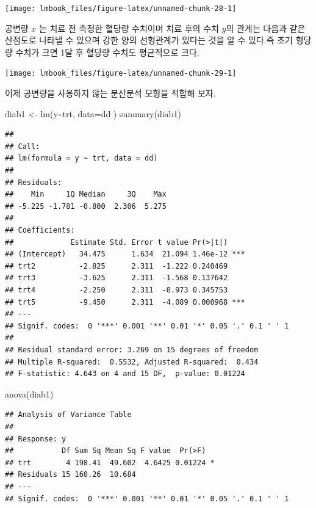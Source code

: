 \documentclass[
  10pt,
]{book}
\newenvironment{Shaded}{\begin{snugshade}}{\end{snugshade}}
\newcommand{\AttributeTok}[1]{\textcolor[rgb]{0.77,0.63,0.00}{#1}}
\newcommand{\FunctionTok}[1]{\textcolor[rgb]{0.00,0.00,0.00}{#1}}
\newcommand{\NormalTok}[1]{#1}
\newcommand{\OtherTok}[1]{\textcolor[rgb]{0.56,0.35,0.01}{#1}}
\newcommand{\SpecialCharTok}[1]{\textcolor[rgb]{0.00,0.00,0.00}{#1}}
\theoremstyle{definition}
\theoremstyle{definition}
\theoremstyle{definition}
\theoremstyle{definition}
\theoremstyle{remark}
\begin{document}
\texttt{[image: lmbook\_files/figure-latex/unnamed-chunk-28-1]}

공변량 \(x\) 는 치료 전 측정한 혈당량 수치이며 치료 후의 수치 \(y\)의 관계는 다음과 같은 산점도로
나타낼 수 있으며 강한 양의 선형관계가 있다는 것을 알 수 있다.즉 초기 형당량 수치가 크면 1달 후 혈당량 수치도 평균적으로 크다.

\texttt{[image: lmbook\_files/figure-latex/unnamed-chunk-29-1]}

이제 공변량을 사용하지 않는 분산분석 모형을 적합해 보자.

\begin{Shaded}
\begin{Highlighting}[]
\NormalTok{diab1 }\OtherTok{\textless{}{-}} \FunctionTok{lm}\NormalTok{(y}\SpecialCharTok{\textasciitilde{}}\NormalTok{trt, }\AttributeTok{data=}\NormalTok{dd )}
\FunctionTok{summary}\NormalTok{(diab1)}
\end{Highlighting}
\end{Shaded}

\begin{verbatim}
## 
## Call:
## lm(formula = y ~ trt, data = dd)
## 
## Residuals:
##    Min     1Q Median     3Q    Max 
## -5.225 -1.781 -0.800  2.306  5.275 
## 
## Coefficients:
##             Estimate Std. Error t value Pr(>|t|)    
## (Intercept)   34.475      1.634  21.094 1.46e-12 ***
## trt2          -2.825      2.311  -1.222 0.240469    
## trt3          -3.625      2.311  -1.568 0.137642    
## trt4          -2.250      2.311  -0.973 0.345753    
## trt5          -9.450      2.311  -4.089 0.000968 ***
## ---
## Signif. codes:  0 '***' 0.001 '**' 0.01 '*' 0.05 '.' 0.1 ' ' 1
## 
## Residual standard error: 3.269 on 15 degrees of freedom
## Multiple R-squared:  0.5532, Adjusted R-squared:  0.434 
## F-statistic: 4.643 on 4 and 15 DF,  p-value: 0.01224
\end{verbatim}

\begin{Shaded}
\begin{Highlighting}[]
\FunctionTok{anova}\NormalTok{(diab1)}
\end{Highlighting}
\end{Shaded}

\begin{verbatim}
## Analysis of Variance Table
## 
## Response: y
##           Df Sum Sq Mean Sq F value  Pr(>F)  
## trt        4 198.41  49.602  4.6425 0.01224 *
## Residuals 15 160.26  10.684                  
## ---
## Signif. codes:  0 '***' 0.001 '**' 0.01 '*' 0.05 '.' 0.1 ' ' 1
\end{verbatim}
\end{document}
